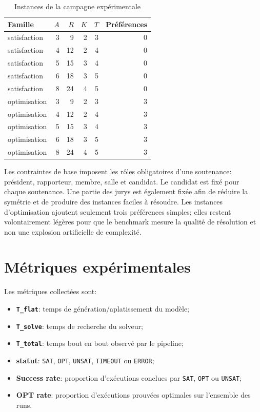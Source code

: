\documentclass[12pt,a4paper]{article}
\newcommand{\sat}{\texttt{SAT}}
\newcommand{\opt}{\texttt{OPT}}
\begin{document}
\begin{table}[htbp]
\centering
\caption{Instances de la campagne expérimentale}
\label{tab:instances}
\begin{tabular}{lrrrrr}
\toprule
\textbf{Famille} & \textbf{$A$} & \textbf{$R$} & \textbf{$K$} & \textbf{$T$} & \textbf{Préférences} \\
\midrule
satisfaction & 3 & 9  & 2 & 3 & 0 \\
satisfaction & 4 & 12 & 2 & 4 & 0 \\
satisfaction & 5 & 15 & 3 & 4 & 0 \\
satisfaction & 6 & 18 & 3 & 5 & 0 \\
satisfaction & 8 & 24 & 4 & 5 & 0 \\
optimisation & 3 & 9  & 2 & 3 & 3 \\
optimisation & 4 & 12 & 2 & 4 & 3 \\
optimisation & 5 & 15 & 3 & 4 & 3 \\
optimisation & 6 & 18 & 3 & 5 & 3 \\
optimisation & 8 & 24 & 4 & 5 & 3 \\
\bottomrule
\end{tabular}
\end{table}

Les contraintes de base imposent les rôles obligatoires d'une soutenance: président, rapporteur, membre, salle et candidat. Le candidat est fixé pour chaque soutenance. Une partie des jurys est également fixée afin de réduire la symétrie et de produire des instances faciles à résoudre. Les instances d'optimisation ajoutent seulement trois préférences simples; elles restent volontairement légères pour que le benchmark mesure la qualité de résolution et non une explosion artificielle de complexité.

\section{Métriques expérimentales}

Les métriques collectées sont:

\begin{itemize}
  \item \textbf{\texttt{T\_flat}}: temps de génération/aplatissement du modèle;
  \item \textbf{\texttt{T\_solve}}: temps de recherche du solveur;
  \item \textbf{\texttt{T\_total}}: temps bout en bout observé par le pipeline;
  \item \textbf{statut}: \sat{}, \opt{}, \texttt{UNSAT}, \texttt{TIMEOUT} ou \texttt{ERROR};
  \item \textbf{Success rate}: proportion d'exécutions conclues par \sat{}, \opt{} ou \texttt{UNSAT};
  \item \textbf{OPT rate}: proportion d'exécutions prouvées optimales sur l'ensemble des runs.
\end{itemize}
\end{document}
